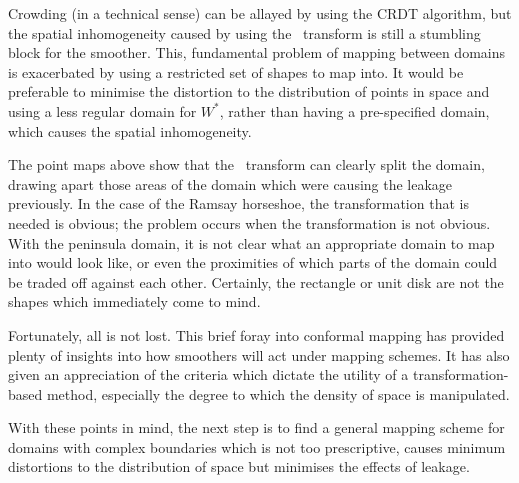 Crowding (in a technical sense) can be allayed by using the CRDT algorithm, but the spatial inhomogeneity caused by using the \sch\ transform is still a stumbling block for the smoother. This, fundamental problem of mapping between domains is exacerbated by using a restricted set of shapes to map into. It would be preferable to minimise the distortion to the distribution of points in space and using a less regular domain for $W^*$, rather than having a pre-specified domain, which causes the spatial inhomogeneity.

The point maps above show that the \sch\ transform can clearly split the domain, drawing apart those areas of the domain which were causing the leakage previously. In the case of the Ramsay horseshoe, the transformation that is needed is obvious; the problem occurs when the transformation is not obvious. With the peninsula domain, it is not clear what an appropriate domain to map into would look like, or even the proximities of which parts of the domain could be traded off against each other. Certainly, the rectangle or unit disk are not the shapes which immediately come to mind.

Fortunately, all is not lost. This brief foray into conformal mapping has provided plenty of insights into how smoothers will act under mapping schemes. It has also given an appreciation of the criteria which dictate the utility of a transformation-based method, especially the degree to which the density of space is manipulated.

With these points in mind, the next step is to find a general mapping scheme for domains with complex boundaries which is not too prescriptive, causes minimum distortions to the distribution of space but minimises the effects of leakage.



